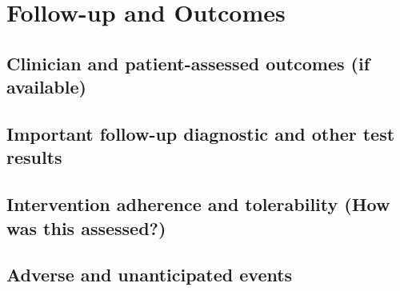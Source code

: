 
\section{Follow-up and Outcomes}
\subsection{Clinician and patient-assessed outcomes (if available)}
\subsection{Important follow-up diagnostic and other test results}
\subsection{Intervention adherence and tolerability (How was this assessed?)}
\subsection{Adverse and unanticipated events}
